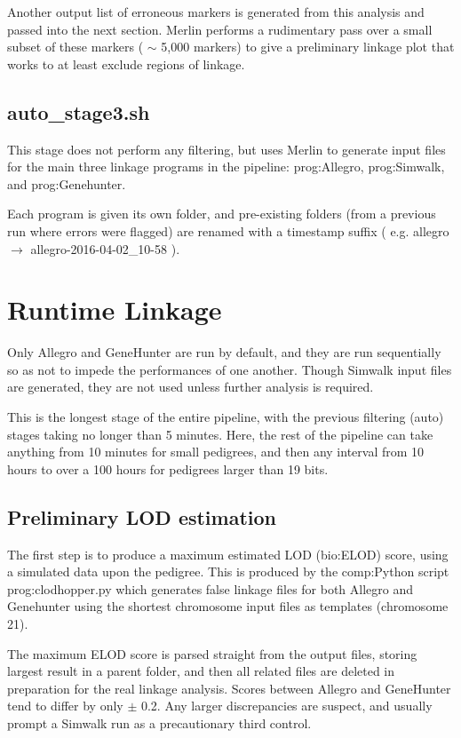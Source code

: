 Another output list of erroneous markers is generated from this analysis and passed into the next section. Merlin performs a rudimentary pass over a small subset of these markers ( $\sim$ 5,000 markers) to give a preliminary linkage plot that works to at least exclude regions of linkage.

\subsection{auto\_stage3.sh}

This stage does not perform any filtering, but uses Merlin to generate input files for the main three linkage programs in the pipeline: \gls{prog:Allegro}, \gls{prog:Simwalk}, and \gls{prog:Genehunter}.

Each program is given its own folder, and pre-existing folders (from a previous run where errors were flagged) are renamed with a timestamp suffix ( e.g. allegro \(\rightarrow\) allegro-2016-04-02\_10-58 ).


\section{Runtime Linkage}

Only Allegro and GeneHunter are run by default, and they are run sequentially so as not to impede the performances of one another. Though Simwalk input files are generated, they are not used unless further analysis is required.

This is the longest stage of the entire pipeline, with the previous filtering (auto) stages taking no longer than 5 minutes. Here, the rest of the pipeline can take anything from 10 minutes for small pedigrees, and then any interval from 10 hours to over a 100 hours for pedigrees larger than 19 bits.

\subsection{Preliminary LOD estimation}

The first step is to produce a maximum estimated LOD (\gls{bio:ELOD}) score, using a simulated data upon the pedigree.  This is produced by the \gls{comp:Python} script \gls{prog:clodhopper.py} which generates false linkage files for both Allegro and Genehunter using the shortest chromosome input files as templates (chromosome 21).

The maximum ELOD score is parsed straight from the output files, storing largest result in a parent folder, and then all related files are deleted in preparation for the real linkage analysis. Scores between Allegro and GeneHunter tend to differ by only $\pm$ 0.2. Any larger discrepancies are suspect, and usually prompt a Simwalk run as a precautionary third control.

